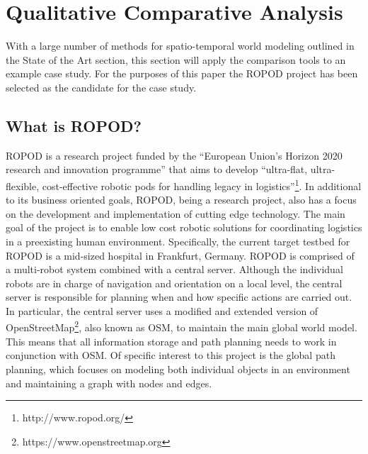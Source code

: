 

  \chapter{Qualitative Comparative Analysis}

  With a large number of methods for spatio-temporal world modeling outlined
  in the State of the Art section, this section will apply the comparison tools
  to an example case study. For the
  purposes of this paper the ROPOD project has been selected as the
  candidate for the case study. \\

  \section{ What is ROPOD? }

  ROPOD is a research project
  funded by the ``European Union's Horizon 2020 research and innovation programme''
  that aims to develop
  ``ultra-flat, ultra-flexible, cost-effective robotic pods for handling legacy in logistics''\footnote[1]{http://www.ropod.org/}.
  In additional to its business
  oriented goals, ROPOD, being a research project, also has a focus on the
  development and implementation of cutting edge technology. The main goal of
  the project is to enable low cost robotic solutions for coordinating logistics
  in a preexisting human environment. Specifically, the current target
  testbed for ROPOD is a mid-sized hospital in Frankfurt, Germany.
  ROPOD is comprised of a multi-robot system combined with a central server.
  Although the individual robots are in charge of navigation and orientation
  on a local level, the central server is responsible for planning when and
  how specific actions are carried out. In particular, the central server uses a
  modified and extended version of
  OpenStreetMap\footnote[2]{https://www.openstreetmap.org}, also known as OSM, to
  maintain the main global world model.
  This means that all information storage and path planning needs to work in
  conjunction with OSM. Of specific interest to this project is the global path
  planning, which focuses on modeling both individual objects in an
  environment and maintaining a graph with nodes and edges. \\


